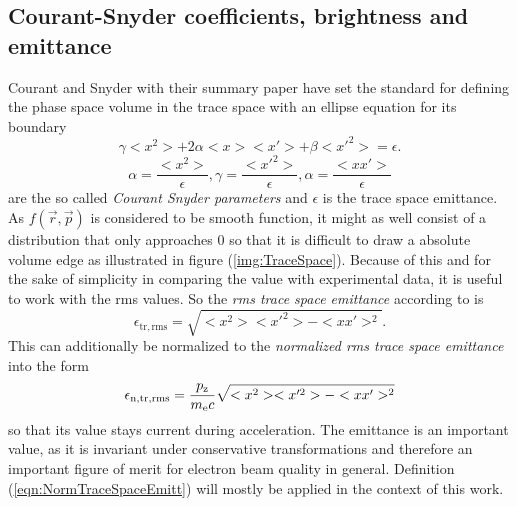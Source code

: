 \subsection{Courant-Snyder coefficients, brightness and emittance}
Courant and Snyder with their summary paper \cite{COURANT1958} have set the standard for defining the phase space volume in the trace space with an ellipse equation for its boundary
\begin{equation}
\label{eqn:CourandSnyderEllipse}
\gamma <x^2>+2\alpha <x> <x'>+\beta <x'^2> =\epsilon.
\end{equation}
\begin{equation}
\alpha =\frac{<x^2>}{\epsilon}, \gamma=\frac{<x'^2>}{\epsilon}, \alpha=\frac{<xx'>}{\epsilon}
\end{equation}
are the so called \textit{Courant Snyder parameters} and $\epsilon$ is the trace space emittance. 
As $f(\vec{r},\vec{p})$ is considered to be smooth function, it might as well consist of a distribution that only approaches 0 so that it is difficult to draw a absolute volume edge as illustrated in figure (\ref{img:TraceSpace}).
Because of this and for the sake of simplicity in comparing the value with experimental data, it is useful to work with the rms values. So the \textit{rms trace space emittance} according to \cite{PhysRevSTAB.6.034202} is
\begin{equation}
\epsilon_\mathrm{tr,rms}=\sqrt{<x^2><x'^2>-<xx'>^2}.
\end{equation}
This can additionally be normalized to the \textit{normalized rms trace space emittance} into the form
\begin{equation}
\label{eqn:NormTraceSpaceEmitt}
\epsilon_\mathrm{n,tr,rms}=\frac{p_\mathrm{z}}{m_\mathrm{e} c}\sqrt{<x^2><x'^2>-<xx'>^2}
\end{equation} 
so that its value stays current during acceleration.
The emittance is an important value, as it is invariant under conservative transformations and therefore an important 
figure of merit for electron beam quality in general. 
Definition (\ref{eqn:NormTraceSpaceEmitt}) will mostly be applied in the context of this work.

